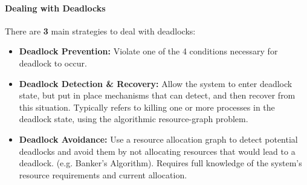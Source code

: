 \documentclass[openany,12pt]{book}
\begin{document}
\paragraph{Dealing with Deadlocks} There are \textbf{3} main strategies to deal with deadlocks:
\begin{itemize}
    \item \textbf{Deadlock Prevention:} Violate one of the 4 conditions necessary for deadlock to occur.

    \item \textbf{Deadlock Detection \& Recovery:} Allow the system to enter deadlock state, but put in place mechanisms that can detect, and then recover from this situation. Typically refers to killing one or more processes in the deadlock state, using the algorithmic resource-graph problem.

    \item \textbf{Deadlock Avoidance:} Use a resource allocation graph to detect potential deadlocks and avoid them by not allocating resources that would lead to a deadlock. (e.g. Banker's Algorithm). Requires full knowledge of the system's resource requirements and current allocation.
\end{itemize}
\end{document}
